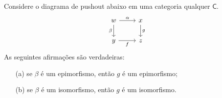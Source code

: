 \begin{teo}\label{teo:props_preservadas_pushout}
    Considere o diagrama de pushout abaixo em uma categoria qualquer $\mathsf{C}$.
    \begin{displaymath}
        \begin{tikzcd}
            w
            \arrow[r, "\alpha"]
            \arrow[d, "\beta" swap]
            & x
            \arrow[d, "g"]
            \\ y
            \arrow[r, "f" swap]
            & z
        \end{tikzcd}
    \end{displaymath}
    As seguintes afirmações são verdadeiras:
    \begin{enumerate}
        \item[(a)] se $\beta$ é um epimorfismo, então $g$ é um epimorfismo;

        \item[(b)] se $\beta$ é um isomorfismo, então $g$ é um isomorfismo.
    \end{enumerate}
\end{teo}

